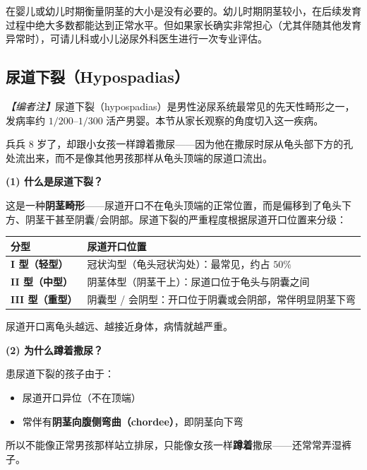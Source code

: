 \begin{tcolorbox}[colback=pink!5!white,colframe=red!50!black,title=贴心小叮咛]
在婴儿或幼儿时期衡量阴茎的大小是没有必要的。幼儿时期阴茎较小，在后续发育过程中绝大多数都能达到正常水平。但如果家长确实非常担心（尤其伴随其他发育异常时），可请儿科或小儿泌尿外科医生进行一次专业评估。
\end{tcolorbox}

\subsection{尿道下裂（Hypospadias）}

\noindent\textit{【编者注】}尿道下裂（hypospadias）是男性泌尿系统最常见的先天性畸形之一，发病率约 $1/200$--$1/300$ 活产男婴。本节从家长观察的角度切入这一疾病。

\vspace{0.5em}
兵兵 $8$ 岁了，却跟小女孩一样蹲着撒尿——因为他在撒尿时尿从龟头部下方的孔处流出来，而不是像其他男孩那样从龟头顶端的尿道口流出。

\vspace{0.5em}
\noindent\textbf{(1) 什么是尿道下裂？}

这是一种\textbf{阴茎畸形}——尿道开口不在龟头顶端的正常位置，而是偏移到了龟头下方、阴茎干甚至阴囊/会阴部。尿道下裂的严重程度根据尿道开口位置来分级：

\begin{tabular}{|p{4cm}|p{9cm}|}
\hline
\textbf{分型} & \textbf{尿道开口位置} \\
\hline
\textbf{I 型（轻型）} & 冠状沟型（龟头冠状沟处）：最常见，约占 $50\%$ \\
\hline
\textbf{II 型（中型）} & 阴茎体型（阴茎干上）：尿道口位于龟头与阴囊之间 \\
\hline
\textbf{III 型（重型）} & 阴囊型 / 会阴型：开口位于阴囊或会阴部，常伴明显阴茎下弯 \\
\hline
\end{tabular}

尿道开口离龟头越远、越接近身体，病情就越严重。

\vspace{0.3em}
\noindent\textbf{(2) 为什么蹲着撒尿？}

患尿道下裂的孩子由于：
\begin{itemize}
	\item 尿道开口异位（不在顶端）
	\item 常伴有\textbf{阴茎向腹侧弯曲（chordee）}，即阴茎向下弯
\end{itemize}
所以不能像正常男孩那样站立排尿，只能像女孩一样\textbf{蹲着}撒尿——还常常弄湿裤子。

